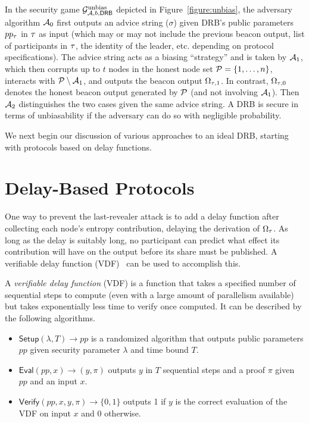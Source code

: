 In the security game $\mathcal{G}^\text{unbias}_{\mathcal{A}, b, \mathsf{DRB}}$ depicted in Figure~\ref{figure:unbias}, the adversary algorithm $\mathcal{A}_0$ first outputs an advice string ($\sigma$) given DRB's public parameters $pp_\tau$ in \epoch $\tau$ as input (which may or may not include the previous beacon output, list of participants in \epoch $\tau$, the identity of the \epoch leader, etc. depending on protocol specifications).
The advice string acts as a biasing ``strategy'' and is taken by $\mathcal{A}_1$, which then corrupts up to $t$ nodes in the honest node set $\mathcal{P} = \{1, \dots, n\}$, interacts with $\mathcal{P}\setminus\mathcal{A}_1$, and outputs the beacon output $\Omega_{\tau, 1}$.
In contrast, $\Omega_{\tau, 0}$ denotes the honest beacon output generated by $\mathcal{P}$ (and not involving $\mathcal{A}_1$).
Then $\mathcal{A}_2$ distinguishes the two cases given the same advice string.
A DRB is secure in terms of unbiasability if the adversary can do so with negligible probability.

We next begin our discussion of various approaches to an ideal DRB, starting with protocols based on delay functions.

\section{Delay-Based Protocols}
\label{section:delay}
One way to prevent the last-revealer attack is to add a delay function after collecting each node's entropy contribution, delaying the derivation of $\Omega_\tau$. As long as the delay is suitably long, no participant can predict what effect its contribution will have on the output before its share must be published. A verifiable delay function (VDF)~\cite{boneh2018verifiable,boneh2018survey} can be used to accomplish this.

\begin{definition}
A \textit{verifiable delay function} (VDF) is a function that takes a specified number of sequential steps to compute (even with a large amount of parallelism available) but takes exponentially less time to verify once computed. It can be described by the following algorithms.
\begin{itemize}
\item $\mathsf{Setup}(\lambda, T) \rightarrow pp$ is a randomized algorithm that outputs public parameters $pp$ given security parameter $\lambda$ and time bound $T$.
\item $\mathsf{Eval}(pp, x) \rightarrow (y, \pi)$ outputs $y$ in $T$ sequential steps and a proof $\pi$ given $pp$ and an input $x$.
\item $\mathsf{Verify}(pp, x, y, \pi) \rightarrow \{0, 1\}$ outputs 1 if $y$ is the correct evaluation of the VDF on input $x$ and 0 otherwise.
\end{itemize}
\end{definition}

